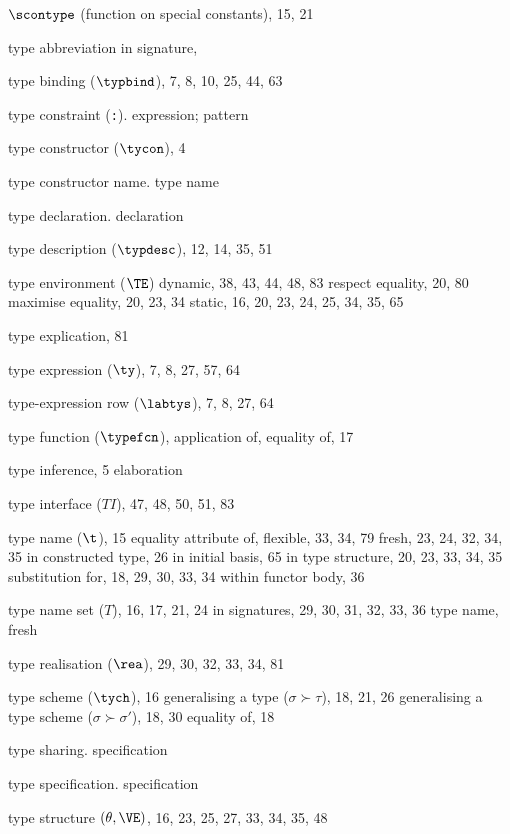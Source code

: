 \begin{theindex}
\item $\scontype$ (function on special constants), 15, 21
\item type abbreviation in signature, \typabbrinsigsrefs
\item type binding ($\typbind$),  7, 8, 10, 25, 44, 63
\item type constraint (\verb+:+). \see expression; pattern
\item type constructor ($\tycon$), 4
\item type constructor name. \see type name
\item type declaration. \see declaration
\item type description ($\typdesc$), 12, 14, 35, 51
\item type environment ($\TE$)
\subitem dynamic, 38,  43, 44, 48, 83
\subitem respect equality, 20, 80
\subitem maximise equality, 20, 23, 34
\subitem static, 16, 20, 23, 24, 25, 34, 35, 65
\item type explication, 81
\item type expression ($\ty$), 7, 8, 27, 57, 64
\item type-expression row ($\labtys$), 7, 8, 27, 64
\item type function ($\typefcn$), \Lambdarefs
\subitem application of, \typefunctionrefs
\subitem equality of, 17
\item type inference, 5
\subitem \seealso elaboration
\item type interface ($T\!I$), 47, 48, 50, 51, 83
\item type name ($\t$), 15
\subitem equality attribute of, \eqtynamerefs
\subitem flexible, 33, 34, 79
\subitem fresh, 23, 24, 32, 34, 35
\subitem in constructed type, 26
\subitem in initial basis, 65
\subitem in type structure, 20, 23, 33, 34, 35
\subitem substitution for, 18, 29, 30, 33, 34
\subitem within functor body, 36
\item type name set ($T$), 16, 17, 21, 24
\subitem in signatures,  29, 30, 31, 32, 33, 36
\subitem \seealso type name, fresh
\item type realisation ($\rea$), 29, 30, 32, 33, 34, 81
\item type scheme ($\tych$), 16
\subitem generalising a type ($\sigma\succ\tau$), 18, 21, 26
\subitem generalising a type scheme ($\sigma\succ\sigma'$), 18, 30
\subitem equality of, 18
\item type sharing. \see specification
\item type specification. \see specification
\item type structure $(\theta,\VE)$, 16, 23, 25, 27, 33, 34, 35, 48

\end{theindex}
